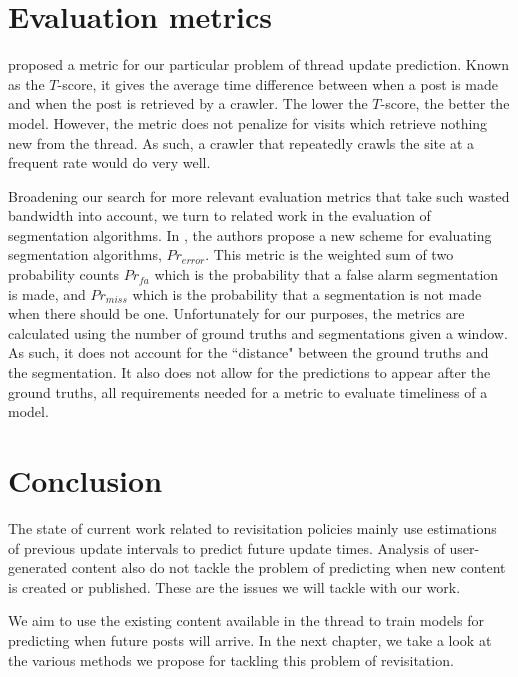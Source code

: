 \section{Evaluation metrics}
 
 proposed a metric for our particular problem of thread update prediction. Known as the $T$-score, it gives the average 
time difference between when a post is made and when the post is retrieved by a crawler. The lower the $T$-score, the 
better the model. However, the metric does not penalize for visits which retrieve 
nothing new from the thread.  As such, a crawler that repeatedly crawls the site 
at a frequent rate would do very well.

Broadening our search for more relevant evaluation metrics that take such
wasted bandwidth into account, we turn to related work in the evaluation of
segmentation algorithms.  In , the authors propose a
new scheme for evaluating segmentation algorithms, $Pr_{error}$. 
This metric is the weighted sum of two 
probability counts $Pr_{fa}$ which is the probability that a false alarm 
segmentation is made, and $Pr_{miss}$ which is the probability that a 
segmentation is not made when there should be one. Unfortunately for our 
purposes, the metrics are calculated using the number of ground truths and 
segmentations given a window. As such, it does not account for the ``distance" 
between the ground truths and the segmentation. It also does not allow for the 
predictions to appear after the ground truths, all requirements needed for a 
metric to evaluate timeliness of a model.


\section{Conclusion}
The state of current work related to revisitation policies mainly use 
estimations of previous update intervals to predict future update times.  
Analysis of user-generated content also do not tackle the problem of predicting 
when new content is created or published. These are the issues we will tackle 
with our work.

We aim to use the existing content available in the thread to train models for 
predicting when future posts will arrive. In the next chapter, we take a look at 
the various methods we propose for tackling this problem of revisitation.
